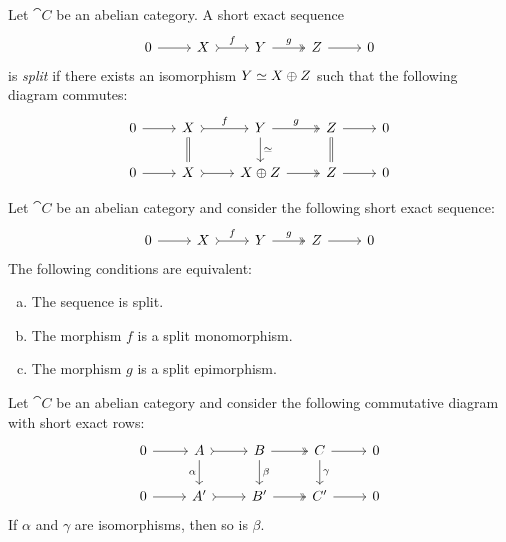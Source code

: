 \begin{definition}
\label{def:abelian-cat-split-short-exact}
Let \(\cat C\) be an abelian category. A short exact sequence
\[
\begin{tikzcd}
0 \ar[r] &X \ar[r, "f", tail] &Y \ar[r, two heads, "g"] &Z \ar[r] &0
\end{tikzcd}
\]
is \emph{split} if there exists an isomorphism \(Y \simeq X \oplus Z\) such that the
following diagram commutes:
\[
\begin{tikzcd}
0 \ar[r]
&X \ar[r, "f", tail] \ar[d, equals]
&Y \ar[r, two heads, "g"] \ar[d, "\dis"]
&Z \ar[r] \ar[d, equals]
&0
\\
0 \ar[r]
&X \ar[r, tail]
&X \oplus Z \ar[r, two heads]
&Z \ar[r]
&0
\end{tikzcd}
\]
\end{definition}

\begin{theorem}
\label{thm:abelian-cat-split-equivalent-conditions}
Let \(\cat C\) be an abelian category and consider the following short exact
sequence:
\[
\begin{tikzcd}
0 \ar[r] &X \ar[r, "f", tail] &Y \ar[r, two heads, "g"] &Z \ar[r] &0
\end{tikzcd}
\]
The following conditions are equivalent:
\begin{enumerate}[(a)]\setlength\itemsep{0em}
\item The sequence is split.

\item The morphism \(f\) is a split monomorphism.

\item The morphism \(g\) is a split epimorphism.
\end{enumerate}
\end{theorem}

\begin{lemma}
\label{lem:abelian-cat-middle-iso-if-lateral-are-iso}
Let \(\cat C\) be an abelian category and consider the following commutative
diagram with short exact rows:
\[
\begin{tikzcd}
0 \ar[r]
&A \ar[r, tail] \ar[d, "\alpha"']
&B \ar[r, two heads] \ar[d, "\beta"]
&C \ar[r] \ar[d, "\gamma"]
&0
\\
0 \ar[r]
&A' \ar[r, tail]
&B' \ar[r, two heads]
&C' \ar[r]
&0
\end{tikzcd}
\]
If \(\alpha\) and \(\gamma\) are isomorphisms, then so is \(\beta\).
\end{lemma}


